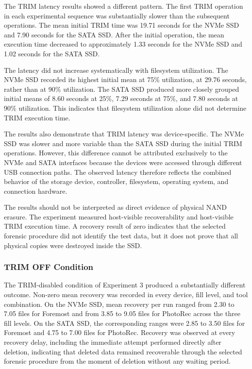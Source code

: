 The TRIM latency results showed a different pattern. The first TRIM operation in each experimental sequence was substantially slower than the subsequent operations. The 
mean initial TRIM time was 19.71 seconds for the NVMe SSD and 7.90 seconds for the SATA SSD. After the initial operation, the mean execution time decreased to 
approximately 1.33 seconds for the NVMe SSD and 1.02 seconds for the SATA SSD. 

The latency did not increase systematically with filesystem utilization. The NVMe SSD recorded its highest initial mean at 75\% utilization, at 29.76 seconds, rather 
than at 90\% utilization. The SATA SSD produced more closely grouped initial means of 8.60 seconds at 25\%, 7.29 seconds at 75\%, and 7.80 seconds at 90\% utilization. 
This indicates that filesystem utilization alone did not determine TRIM execution time.

The results also demonstrate that TRIM latency was device-specific. The NVMe SSD was slower and more variable than the SATA SSD during the initial TRIM operations. 
However, this difference cannot be attributed exclusively to the NVMe and SATA interfaces because the devices were accessed through different USB connection paths. The 
observed latency therefore reflects the combined behavior of the storage device, controller, filesystem, operating system, and connection hardware.

The results should not be interpreted as direct evidence of physical NAND erasure. The experiment measured host-visible recoverability and host-visible TRIM execution 
time. A recovery result of zero indicates that the selected forensic procedure did not identify the test data, but it does not prove that all physical copies were 
destroyed inside the SSD.

\subsubsection*{TRIM OFF Condition}

The TRIM-disabled condition of Experiment 3 produced a substantially different outcome. Non-zero mean recovery was recorded in every device, fill level, and tool 
combination. On the NVMe SSD, mean recovery per run ranged from 2.30 to 7.05 files for Foremost and from 3.85 to 9.05 files for PhotoRec across the three fill levels. 
On the SATA SSD, the corresponding ranges were 2.85 to 3.50 files for Foremost and 4.75 to 7.00 files for PhotoRec. Recovery was observed at every recovery delay, 
including the immediate attempt performed directly after deletion, indicating that deleted data remained recoverable through the selected forensic procedure from the 
moment of deletion without any waiting period.

